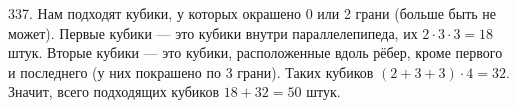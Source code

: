 337. Нам подходят кубики, у которых окрашено 0 или 2 грани (больше быть не может). Первые кубики --- это кубики внутри параллелепипеда, их $2\cdot3\cdot3=18$ штук. Вторые кубики --- это кубики, расположенные вдоль рёбер, кроме первого и последнего (у них покрашено по 3 грани). Таких кубиков $(2+3+3)\cdot4=32.$ Значит, всего подходящих кубиков $18+32=50$ штук.\\
